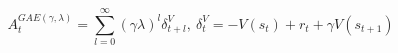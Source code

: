 $$A_t^{GAE(\gamma,\lambda)} = \sum_{l=0}^{\infty}(\gamma\lambda)^l\delta_{t+l}^V, \ \delta_t^V = -V(s_t) + r_t + γV(s_{t+1})$$


